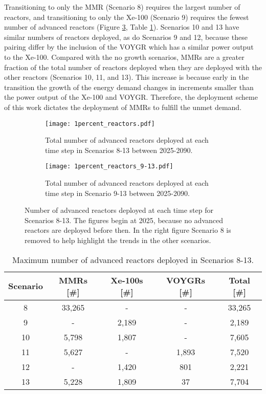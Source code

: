 Transitioning to only the 
\gls{MMR} (Scenario 8) requires the largest number of reactors, and 
transitioning to only the Xe-100 (Scenario 9) requires the fewest 
number of advanced reactors (Figure \ref{fig:1percent_reactors}, Table 
\ref{tab:reactors_1percent}). Scenarios 10 and 13 have similar numbers of 
reactors deployed, as do Scenarios 9 and 12, because these pairing differ 
by the inclusion of the VOYGR which has a similar power output to the 
Xe-100. 
Compared with the no growth scenarios, \glspl{MMR} are a greater 
fraction of the total number of reactors deployed when they are deployed 
with the other reactors (Scenarios 10, 11, and 13). This increase is 
because early in the transition the growth of the energy demand 
changes in increments smaller than the power output of the Xe-100 and 
VOYGR. Therefore, the deployment scheme of this work dictates the 
deployment of \glspl{MMR} to fulfill the unmet demand. 

\begin{figure}[h!]
    \centering
    \begin{subfigure}[b]{0.45\textwidth}
        \centering
        \texttt{[image: 1percent\_reactors.pdf]}
        \caption{Total number of advanced reactors deployed at 
        each time step in Scenarios 8-13 between 2025-2090.}
        \label{fig:1percent_reactors_all}
    \end{subfigure}
    \hfill
    \begin{subfigure}[b]{0.45\textwidth}
        \centering
        \texttt{[image: 1percent\_reactors\_9-13.pdf]}
        \caption{Total number of advanced reactors deployed at 
        each time step in Scenario 9-13 between 2025-2090.}
        \label{fig:1percent_reactors_9-13}
    \end{subfigure}
       \caption{Number of advanced reactors deployed at each time step 
       for Scenarios 8-13. The figures begin at 2025, because no advanced 
       reactors are deployed before then. In the right figure Scenario 
       8 is removed to help highlight the trends in the other scenarios.}
       \label{fig:1percent_reactors}
\end{figure}

\begin{table}
    \centering 
    \caption{Maximum number of advanced reactors deployed in Scenarios 8-13.}
    \label{tab:reactors_1percent}
    \begin{tabular}{c c c c c}
        \hline
        Scenario & \glspl{MMR} [\#]& Xe-100s [\#]& VOYGRs [\#] 
        & Total [\#]\\\hline
        8 & 33,265 & - & - & 33,265\\
        9 & - & 2,189 & - & 2,189 \\
        10 & 5,798 & 1,807 & - & 7,605\\
        11 & 5,627 & - & 1,893 & 7,520\\
        12 & - & 1,420 & 801 & 2,221\\
        13 & 5,228 & 1,809 & 37 & 7,704\\
        \hline
    \end{tabular}
\end{table}

